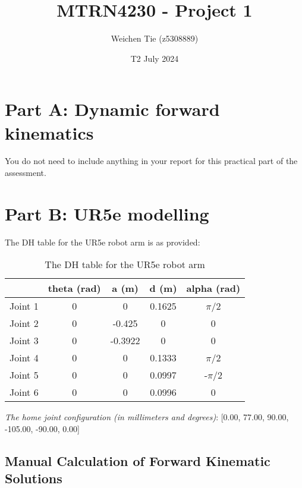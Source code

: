 \documentclass[12pt]{article}
\title{MTRN4230 - Project 1}
\author{Weichen Tie (z5308889)}
\date{T2 July 2024}
\begin{document}
\maketitle
\tableofcontents
\section{Part A: Dynamic forward kinematics}
You do not need to include anything in your report for this practical part of the assessment.

\section{Part B: UR5e modelling}

The DH table for the UR5e robot arm is as provided:
\begin{table}[H]
    \centering
    \begin{tabular}{|c|c|c|c|c|}
        \hline
                & \textbf{theta (rad)} & \textbf{a (m)} & \textbf{d (m)} & \textbf{alpha (rad)} \\ \hline
        Joint 1 & 0                    & 0              & 0.1625         & $\pi$/2              \\ \hline
        Joint 2 & 0                    & -0.425         & 0              & 0                    \\ \hline
        Joint 3 & 0                    & -0.3922        & 0              & 0                    \\ \hline
        Joint 4 & 0                    & 0              & 0.1333         & $\pi$/2              \\ \hline
        Joint 5 & 0                    & 0              & 0.0997         & -$\pi$/2             \\ \hline
        Joint 6 & 0                    & 0              & 0.0996         & 0                    \\ \hline
    \end{tabular}
    \caption{The DH table for the UR5e robot arm}
    \label{table:DH-UR5e default}
\end{table}

\textit{The home joint configuration (in  millimeters and degrees)}: [0.00, 77.00, 90.00, -105.00, -90.00, 0.00]

\subsection{Manual Calculation of Forward Kinematic Solutions}
\end{document}

